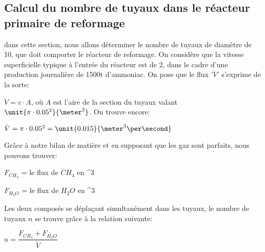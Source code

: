 \documentclass{article}
\begin{document}
\subsection{Calcul du nombre de tuyaux dans le réacteur primaire de reformage}

dans cette section, nous allons déterminer le nombre de tuyaux de diamètre de \unit{10}{\centi\meter}, que doit comporter le réacteur de reformage. On considère que la vitesse superficielle typique à l'entrée du réacteur est de \unit{2}{\meter\per\second}, dans le cadre d'une production journalière de \unit{1500}{t} d'ammoniac. On pose que le flux '$\dot{V}$' s'exprime de la sorte:

$\dot{V} = v \cdot A$, où $A$ est l'aire de la section du tuyaux valant $\unit{\pi \cdot 0.05^2}{\meter ^2}$. On trouve encore:

$\dot{V} = \pi \cdot 0.05^2 = \unit{0.015}{\meter ^3 \per\second}$

Grâce à notre bilan de matière et en supposant que les gaz sont parfaits, nous pouvons trouver:

$F_{CH_4}$ = le flux de $CH_4$ en \unit{}{\meter ^3 \per\second}

$F_{H_2O}$ = le flux de $H_2O$ en \unit{}{\meter ^3 \per\second}

Les deux composés se déplaçant simultanément dans les tuyaux, le nombre de tuyaux $n$ se trouve grâce à la relation suivante:

$n = \dfrac{F_{CH_4} + F_{H_2O}}{\dot{V}}$
\end{document}

